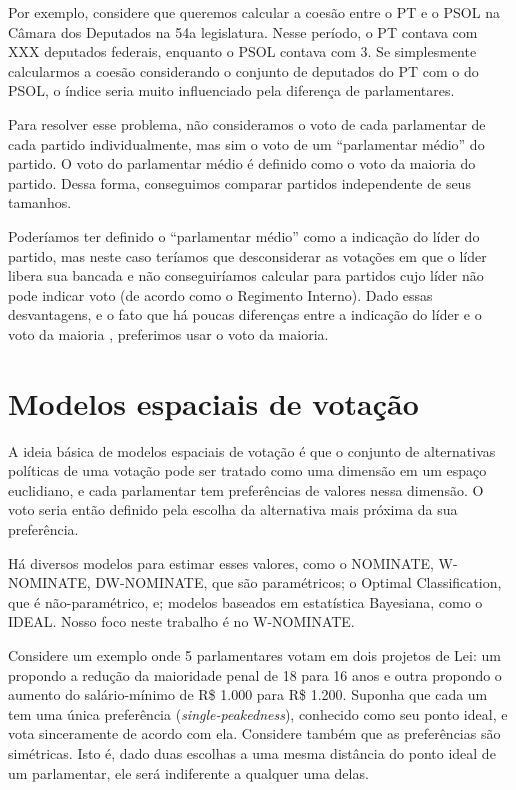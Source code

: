 \documentclass[a4paper,titlepage]{ppgi}\usepackage[]{graphicx}\usepackage[]{color}
\begin{document}
Por exemplo, considere que queremos calcular a coesão entre o \gls{PT} e o \gls{PSOL} na
Câmara dos Deputados na 54a legislatura. Nesse período, o \gls{PT} contava com XXX
deputados federais, enquanto o \gls{PSOL} contava com 3. Se simplesmente calcularmos
a coesão considerando o conjunto de deputados do \gls{PT} com o do \gls{PSOL}, o índice
seria muito influenciado pela diferença de parlamentares.

Para resolver esse problema, não consideramos o voto de cada parlamentar de
cada partido individualmente, mas sim o voto de um ``parlamentar médio'' do
partido. O voto do parlamentar médio é definido como o voto da maioria do
partido. Dessa forma, conseguimos comparar partidos independente de seus
tamanhos.

Poderíamos ter definido o ``parlamentar médio'' como a indicação do líder do
partido, mas neste caso teríamos que desconsiderar as votações em que o líder
libera sua bancada e não conseguiríamos calcular para partidos cujo líder não
pode indicar voto (de acordo como o Regimento Interno). Dado essas
desvantagens, e o fato que há poucas diferenças entre a indicação do líder e o
voto da maioria \cite{Figueiredo1995}, preferimos usar o voto da maioria.

\section{Modelos espaciais de votação}



A ideia básica de modelos espaciais de votação é que o conjunto de alternativas
políticas de uma votação pode ser tratado como uma dimensão em um espaço
euclidiano, e cada parlamentar tem preferências de valores nessa dimensão. O
voto seria então definido pela escolha da alternativa mais próxima da sua
preferência.

Há diversos modelos para estimar esses valores, como o NOMINATE, W-NOMINATE,
DW-NOMINATE, que são paramétricos; o Optimal Classification, que é
não-paramétrico, e; modelos baseados em estatística Bayesiana, como o IDEAL.
Nosso foco neste trabalho é no W-NOMINATE.
\cite{Poole2000,Poole2005,Poole2014,Jackman2000,Clinton2004}

Considere um exemplo onde 5 parlamentares votam em
dois projetos de Lei: um propondo a redução da maioridade penal de
18 para 16 anos e outra
propondo o aumento do salário-mínimo de R\$ 1.000 para
R\$ 1.200. Suponha que cada um tem uma única preferência
(\emph{single-peakedness}), conhecido como seu ponto ideal, e vota sinceramente
de acordo com ela. Considere também que as preferências são simétricas. Isto é,
dado duas escolhas a uma mesma distância do ponto ideal de um parlamentar, ele
será indiferente a qualquer uma delas.
\end{document}
